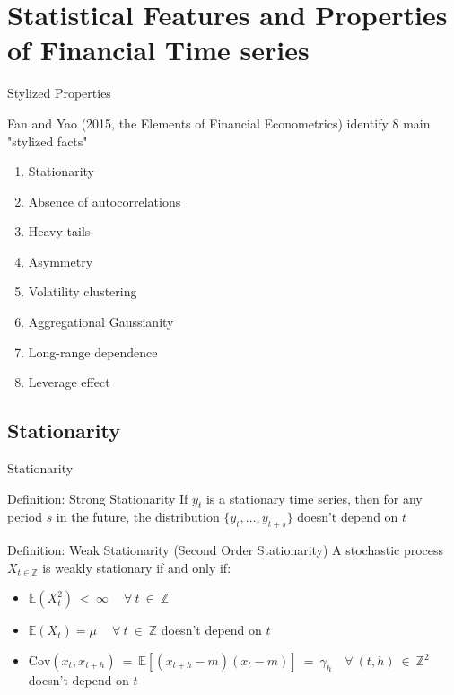 \documentclass{beamer}
\begin{document}
    
\section{Statistical Features and Properties of Financial Time series}

\begin{frame}
  {Stylized Properties}

  Fan and Yao (2015, the Elements of Financial Econometrics) identify 8 main "stylized facts"
  
  \begin{enumerate}
  \item Stationarity
  \item Absence of autocorrelations
  \item Heavy tails
  \item Asymmetry
  \item Volatility clustering
  \item Aggregational Gaussianity
  \item Long-range dependence
  \item Leverage effect
  \end{enumerate}
  
\end{frame}

\subsection{Stationarity}
\begin{frame}{Stationarity}

\begin{block}{Definition: Strong Stationarity }
    If ${y_t}$ is a stationary time series, then for any period $s$ in the future, the distribution $\{y_t, \dots, y_{t+s}\}$ doesn't depend on $t$
  \end{block}
 \medskip
 
 \begin{block}{Definition: Weak Stationarity (Second Order Stationarity)}
   A stochastic process $X_{t \in \mathbb{Z}}$ is weakly stationary if and only if:

   \begin{itemize}
   \item $\mathbb{E}(X^2_t) \ < \ \infty \ \quad \forall \ t \ \in \ \mathbb{Z}$
   \item $\mathbb{E}(X_t) = \mu \ \quad \forall \ t \ \in \ \mathbb{Z}$ doesn't depend on $t$
   \item $\text{Cov}(x_t, x_{t+h}) \ = \ \mathbb{E}[(x_{t+h} - m)(x_t - m)] \ = \ \gamma_h \quad \forall \ (t, h) \ \in \ \mathbb{Z}^2$ doesn't depend on $t$
   \end{itemize}
 \end{block}
 
\end{frame}
\end{document}
